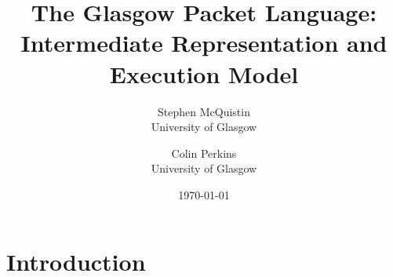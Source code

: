 \documentclass[10pt,twocolumn,a4paper]{article}
\begin{document}
\title{The Glasgow Packet Language: Intermediate Representation and Execution Model}
\author{
  Stephen McQuistin\\University of Glasgow
\and 
  Colin Perkins\\University of Glasgow
}
\date{\today}
\maketitle
\begin{abstract}




\end{abstract}
\section{Introduction}










\end{document}
